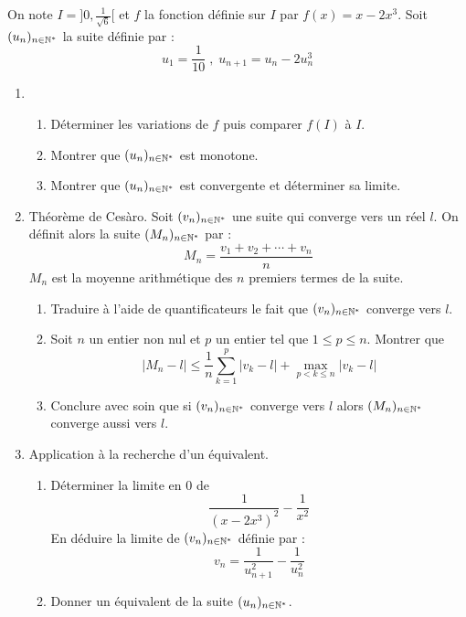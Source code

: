 On note $I=]0,\frac{1}{\sqrt{6}}[$ et  $f$ la fonction définie sur $I$ par $f(x)=x-2x^3$. Soit $(u_n)_{n\in \mathbb{N}^{*}}$ la suite définie par :
\[
u_1=\frac{1}{10}\;,\; u_{n+1}=u_n-2u_n^3\]
\begin{enumerate}
\item 
\begin{enumerate}
	\item Déterminer les variations de $f$ puis comparer $f(I)$ à $I$.
	\item Montrer que $(u_n)_{n\in \mathbb{N}^{*}}$ est monotone.
	\item Montrer que $(u_n)_{n\in \mathbb{N}^{*}}$ est convergente et déterminer sa limite.
\end{enumerate}
\item Théorème de Ces\`aro.\newline
Soit $(v_n)_{n\in \mathbb{N}^{*}}$ une suite qui converge vers un réel $l$. On définit alors la suite $(M_n)_{n\in \mathbb{N}^{*}}$ par :
\[M_n=\frac{v_1+v_2+\cdots +v_n}{n}\]
$M_n$ est la moyenne arithmétique des $n$ premiers termes de la suite.
\begin{enumerate}
	\item Traduire à l'aide de quantificateurs le fait que $(v_n)_{n\in \mathbb{N}^{*}}$ converge vers $l$.
	\item Soit $n$ un entier non nul et $p$ un entier tel que $1\leq p\leq n$. Montrer que
	\[
	\vert M_n - l \vert \leq \frac{1}{n}\sum_{k=1}^p \vert v_k - l\vert  + \max_{p <k \leq n} \vert v_k - l\vert
	\]
	\item Conclure avec soin que si $(v_n)_{n\in \mathbb{N}^{*}}$ converge vers $l$ alors $(M_n)_{n\in \mathbb{N}^{*}}$ converge aussi vers $l$.
\end{enumerate}
\item Application à la recherche d'un équivalent.
\begin{enumerate}
	\item Déterminer la limite  en $0$ de
	\[\frac{1}{(x-2x^3)^2}-\frac{1}{x^2}\]
	En déduire la limite de $(v_n)_{n\in \mathbb{N}^{*}}$ définie par :
	\[v_n=\frac{1}{u_{n+1}^2} - \frac{1}{u_{n}^2}\]
	\item Donner un équivalent de la suite $(u_n)_{n\in \mathbb{N}^{*}}$. 
\end{enumerate}
\end{enumerate}